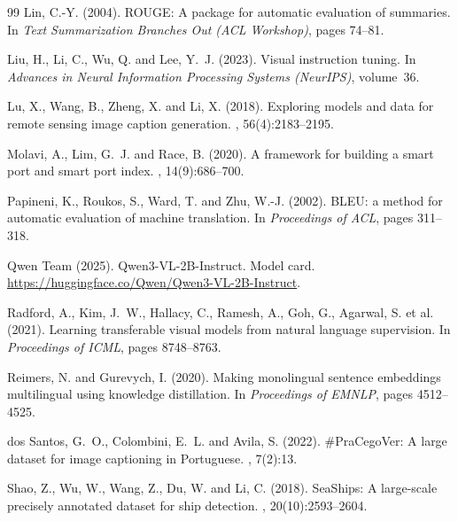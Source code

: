 \begin{thebibliography}{99}
Lin, C.-Y. (2004).
\newblock ROUGE: A package for automatic evaluation of summaries.
\newblock In {\em Text Summarization Branches Out (ACL Workshop)}, pages 74--81.

Liu, H., Li, C., Wu, Q. and Lee, Y.~J. (2023).
\newblock Visual instruction tuning.
\newblock In {\em Advances in Neural Information Processing Systems (NeurIPS)}, volume~36.

Lu, X., Wang, B., Zheng, X. and Li, X. (2018).
\newblock Exploring models and data for remote sensing image caption generation.
, 56(4):2183--2195.

Molavi, A., Lim, G.~J. and Race, B. (2020).
\newblock A framework for building a smart port and smart port index.
, 14(9):686--700.

Papineni, K., Roukos, S., Ward, T. and Zhu, W.-J. (2002).
\newblock BLEU: a method for automatic evaluation of machine translation.
\newblock In {\em Proceedings of ACL}, pages 311--318.

Qwen Team (2025).
\newblock Qwen3-VL-2B-Instruct.
\newblock Model card. \url{https://huggingface.co/Qwen/Qwen3-VL-2B-Instruct}.

Radford, A., Kim, J.~W., Hallacy, C., Ramesh, A., Goh, G., Agarwal, S. et al. (2021).
\newblock Learning transferable visual models from natural language supervision.
\newblock In {\em Proceedings of ICML}, pages 8748--8763.

Reimers, N. and Gurevych, I. (2020).
\newblock Making monolingual sentence embeddings multilingual using knowledge distillation.
\newblock In {\em Proceedings of EMNLP}, pages 4512--4525.

dos Santos, G.~O., Colombini, E.~L. and Avila, S. (2022).
\newblock \#PraCegoVer: A large dataset for image captioning in Portuguese.
, 7(2):13.

Shao, Z., Wu, W., Wang, Z., Du, W. and Li, C. (2018).
\newblock SeaShips: A large-scale precisely annotated dataset for ship detection.
, 20(10):2593--2604.


\end{thebibliography}
